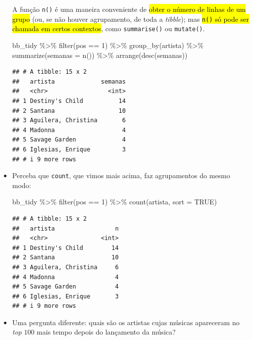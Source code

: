 \documentclass[
  11pt]{report}
\newenvironment{Shaded}{\begin{snugshade}}{\end{snugshade}}
\newcommand{\AttributeTok}[1]{\textcolor[rgb]{0.77,0.63,0.00}{#1}}
\newcommand{\ConstantTok}[1]{\textcolor[rgb]{0.00,0.00,0.00}{#1}}
\newcommand{\DecValTok}[1]{\textcolor[rgb]{0.00,0.00,0.81}{#1}}
\newcommand{\FunctionTok}[1]{\textcolor[rgb]{0.00,0.00,0.00}{#1}}
\newcommand{\NormalTok}[1]{#1}
\newcommand{\SpecialCharTok}[1]{\textcolor[rgb]{0.00,0.00,0.00}{#1}}
\renewenvironment{Shaded}{
    \begin{mdframed}[%
      roundcorner=2pt,%
      innerleftmargin=5pt,%
      innerrightmargin=5pt,%
      topline=true,%
      leftline=true,%
      rightline=true,%
      bottomline=true,%
      linewidth=0.5pt,%
      linecolor=black!20,%
      backgroundcolor=black!2,%
      skipabove=2ex,%
      skipbelow=2.5ex%
    ]%
  }
  {
    \end{mdframed}
  }
\begin{document}
\begin{itemize}
  A função \texttt{n()} é uma maneira conveniente de {\hl{obter o número de linhas de um grupo}} (ou, se não houver agrupamento, de toda a \emph{tibble}); mas {\hl{{\mbox{\texttt{n()}}} só pode ser chamada em certos contextos}}, como \texttt{summarise()} ou \texttt{mutate()}.

\begin{Shaded}
\begin{Highlighting}[]
\NormalTok{bb\_tidy }\SpecialCharTok{\%\textgreater{}\%} 
  \FunctionTok{filter}\NormalTok{(pos }\SpecialCharTok{==} \DecValTok{1}\NormalTok{) }\SpecialCharTok{\%\textgreater{}\%} 
  \FunctionTok{group\_by}\NormalTok{(artista) }\SpecialCharTok{\%\textgreater{}\%}
  \FunctionTok{summarize}\NormalTok{(}\AttributeTok{semanas =} \FunctionTok{n}\NormalTok{()) }\SpecialCharTok{\%\textgreater{}\%} 
  \FunctionTok{arrange}\NormalTok{(}\FunctionTok{desc}\NormalTok{(semanas))}
\end{Highlighting}
\end{Shaded}

\begin{verbatim}
## # A tibble: 15 x 2
##   artista             semanas
##   <chr>                 <int>
## 1 Destiny's Child          14
## 2 Santana                  10
## 3 Aguilera, Christina       6
## 4 Madonna                   4
## 5 Savage Garden             4
## 6 Iglesias, Enrique         3
## # i 9 more rows
\end{verbatim}
\item
  Perceba que \texttt{count}, que vimos mais acima, faz agrupamentos do mesmo modo:

\begin{Shaded}
\begin{Highlighting}[]
\NormalTok{bb\_tidy }\SpecialCharTok{\%\textgreater{}\%} 
  \FunctionTok{filter}\NormalTok{(pos }\SpecialCharTok{==} \DecValTok{1}\NormalTok{) }\SpecialCharTok{\%\textgreater{}\%} 
  \FunctionTok{count}\NormalTok{(artista, }\AttributeTok{sort =} \ConstantTok{TRUE}\NormalTok{)}
\end{Highlighting}
\end{Shaded}

\begin{verbatim}
## # A tibble: 15 x 2
##   artista                 n
##   <chr>               <int>
## 1 Destiny's Child        14
## 2 Santana                10
## 3 Aguilera, Christina     6
## 4 Madonna                 4
## 5 Savage Garden           4
## 6 Iglesias, Enrique       3
## # i 9 more rows
\end{verbatim}
\item
  Uma pergunta diferente: quais são os artistas cujas músicas apareceram no \emph{top} $100$ mais tempo depois do lançamento da música?


\end{itemize}
\end{document}
